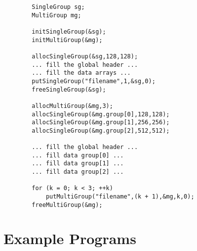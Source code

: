 \begin{scriptsize}
\begin{verbatim}
        SingleGroup sg;
        MultiGroup mg;

        initSingleGroup(&sg);
        initMultiGroup(&mg);

        allocSingleGroup(&sg,128,128);
        ... fill the global header ...
        ... fill the data arrays ...
        putSingleGroup("filename",1,&sg,0);
        freeSingleGroup(&sg);

        allocMultiGroup(&mg,3);
        allocSingleGroup(&mg.group[0],128,128);
        allocSingleGroup(&mg.group[1],256,256);
        allocSingleGroup(&mg.group[2],512,512);

        ... fill the global header ...
        ... fill data group[0] ...
        ... fill data group[1] ...
        ... fill data group[2] ...

        for (k = 0; k < 3; ++k)
            putMultiGroup("filename",(k + 1),&mg,k,0);
        freeMultiGroup(&mg);
\end{verbatim}
\end{scriptsize}

\section{Example Programs}

